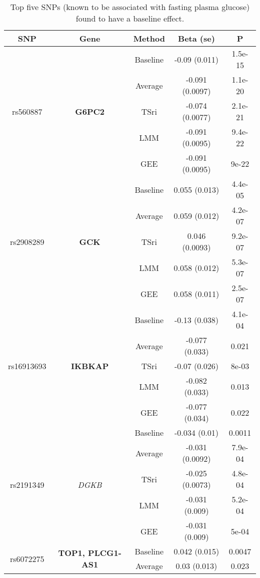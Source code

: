 \begin{table}[ht]
\centering
\caption{Top five SNPs (known to be associated with fasting plasma glucose) found to have a baseline effect.} 
\label{tab:topintercept}
{\small
\begin{tabular}{ccccc}
  \hline
SNP & Gene & Method & Beta (se) & P \\ 
  \hline
\hline
\multirow{5}{*}{rs560887} & \multirow{5}{*}{\textbf{G6PC2}} & Baseline & -0.09 (0.011) & 1.5e-15 \\ 
   &  & Average & -0.091 (0.0097) & 1.1e-20 \\ 
   &  & TSri & -0.074 (0.0077) & 2.1e-21 \\ 
   &  & LMM & -0.091 (0.0095) & 9.4e-22 \\ 
   &  & GEE & -0.091 (0.0095) & 9e-22 \\ 
   \hline
\multirow{5}{*}{rs2908289} & \multirow{5}{*}{\textbf{GCK}} & Baseline & 0.055 (0.013) & 4.4e-05 \\ 
   &  & Average & 0.059 (0.012) & 4.2e-07 \\ 
   &  & TSri & 0.046 (0.0093) & 9.2e-07 \\ 
   &  & LMM & 0.058 (0.012) & 5.3e-07 \\ 
   &  & GEE & 0.058 (0.011) & 2.5e-07 \\ 
   \hline
\multirow{5}{*}{rs16913693} & \multirow{5}{*}{\textbf{IKBKAP}} & Baseline & -0.13 (0.038) & 4.1e-04 \\ 
   &  & Average & -0.077 (0.033) & 0.021 \\ 
   &  & TSri & -0.07 (0.026) & 8e-03 \\ 
   &  & LMM & -0.082 (0.033) & 0.013 \\ 
   &  & GEE & -0.077 (0.034) & 0.022 \\ 
   \hline
\multirow{5}{*}{rs2191349} & \multirow{5}{*}{\textit{DGKB}} & Baseline & -0.034 (0.01) & 0.0011 \\ 
   &  & Average & -0.031 (0.0092) & 7.9e-04 \\ 
   &  & TSri & -0.025 (0.0073) & 4.8e-04 \\ 
   &  & LMM & -0.031 (0.009) & 5.2e-04 \\ 
   &  & GEE & -0.031 (0.009) & 5e-04 \\ 
   \hline
\multirow{5}{*}{rs6072275} & \multirow{5}{*}{\textbf{TOP1, PLCG1-AS1}} & Baseline & 0.042 (0.015) & 0.0047 \\ 
   &  & Average & 0.03 (0.013) & 0.023 \\ 

\end{tabular}}
\end{table}
